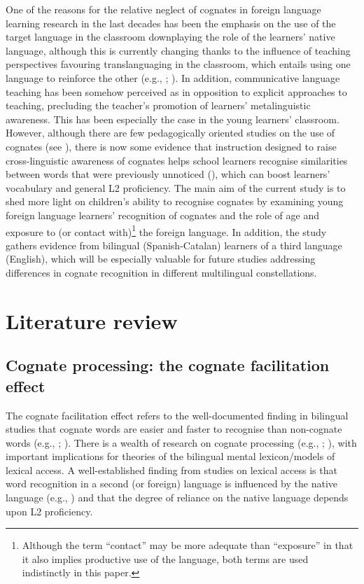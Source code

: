 \documentclass[output=paper,modfonts,nonflat,newtxmath]{langsci/langscibook}
\begin{document}
 {One of the reasons for the relative neglect of cognates in foreign language learning research in the last decades has been the emphasis on the use of the target language in the classroom downplaying the role of the learners’ native language, although this is currently changing thanks to the influence of teaching perspectives favouring translanguaging in the classroom, which entails using one language to reinforce the other (e.g., \citealt{Williams2002}; \citealt{GarcíaLin2016}). In addition, communicative language teaching has been somehow perceived as in opposition to explicit approaches to teaching, precluding the teacher’s promotion of learners’ metalinguistic awareness. This has been especially the case in the young learners’ classroom. However, although there are few pedagogically oriented studies on the use of cognates (see \citealt{Otwinowska2016}), there is now some evidence that instruction designed to raise cross-linguistic awareness of cognates helps school learners recognise similarities between words that were previously unnoticed (\citealt{WhiteHorst2012}), which can boost learners’ vocabulary and general L2 proficiency. The main aim of the current study is to shed more light on children’s ability to recognise cognates by examining young foreign language learners’ recognition of cognates and the role of age and exposure to (or contact with)}\footnote{ {Although the term “contact” may be more adequate than “exposure” in that it also implies productive use of the language, both terms are used indistinctly in this paper.}} {the foreign language.}{ }{In addition, the study gathers evidence from bilingual (Spanish-Catalan) learners of a third language (English), which will be especially valuable for future studies addressing differences in cognate recognition in different multilingual constellations.}

\section{Literature review}


\subsection{Cognate processing: the cognate facilitation effect}

The cognate facilitation effect refers to the well-documented finding in bilingual studies that cognate words are easier and faster to recognise than non-cognate words (e.g., \citealt{CaramazzaBrones1979}; \citealt{CostaEtAl2000}). There is a wealth of research on cognate processing (e.g., \citealt{VanHellDeGroot1998}; \citealt{DijkstraEtAl1999}), with important implications for theories of the bilingual mental lexicon/models of lexical access. A well-established finding from studies on lexical access is that word recognition in a second (or foreign) language is influenced by the native language (e.g., \citealt{KrollDijkstra2002}) and that the degree of reliance on the native language depends upon L2 proficiency.
\end{document}
